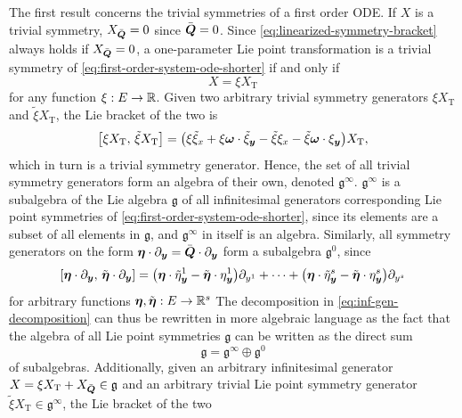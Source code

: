 The first result concerns the trivial symmetries of a first order ODE.
If \(X\) is a trivial symmetry, \(X_{\bar{\boldsymbol{Q}}} = 0\) since \(\bar{\boldsymbol{Q}} = 0\).
Since \cref{eq:linearized-symmetry-bracket} always holds if \(X_{\bar{\boldsymbol{Q}}} = 0\), a one-parameter Lie point transformation is a trivial symmetry of \cref{eq:first-order-system-ode-shorter} if and only if
\begin{equation*}
  X = \xi X_{\text{T}}
\end{equation*}
for any function \(\xi: E \to \mathbb{R}\).
Given two arbitrary trivial symmetry generators \(\xi X_{\text{T}}\) and \(\tilde{\xi} X_{\text{T}}\), the Lie bracket of the two is
\begin{equation*}
  \comm{\xi X_{\text{T}}}{\tilde{\xi} X_{\text{T}}} = \left(\xi \tilde{\xi}_x + \xi \vect{\omega} \cdot \tilde{\xi}_{\vect{y}} - \tilde{\xi} \xi_x - \tilde{\xi} \vect{\omega} \cdot \xi_{\vect{y}} \right) X_{\text{T}},
\end{equation*}
which in turn is a trivial symmetry generator.
Hence, the set of all trivial symmetry generators form an algebra of their own, denoted \(\mathfrak{g}^\infty\).
\(\mathfrak{g}^\infty\) is a subalgebra of the Lie algebra \(\mathfrak{g}\) of all infinitesimal generators corresponding Lie point symmetries of \cref{eq:first-order-system-ode-shorter}, since its elements are a subset of all elements in \(\mathfrak{g}\), and \(\mathfrak{g}^\infty\) in itself is an algebra.
Similarly, all symmetry generators on the form \(\boldsymbol{\eta} \cdot \partial_{\boldsymbol{y}} = \bar{\boldsymbol{Q}} \cdot \partial_{\boldsymbol{y}}\) form a subalgebra \(\mathfrak{g}^0\), since
\begin{equation*}
  \comm{\vect{\eta} \cdot \partial_{\vect{y}}}{\tilde{\vect{\eta}} \cdot \partial_{\vect{y}}} = \left(\vect{\eta} \cdot \tilde{\eta}^1_{\vect{y}} - \tilde{\vect{\eta}} \cdot \eta^1_{\vect{y}}\right) \partial_{y^1} + \dots + \left(\vect{\eta} \cdot \tilde{\eta}^s_{\vect{y}} - \tilde{\vect{\eta}} \cdot \eta^s_{\vect{y}}\right) \partial_{y^s}
\end{equation*}
for arbitrary functions \(\boldsymbol{\eta}, \tilde{\boldsymbol{\eta}}: E \to \mathbb{R}^s\)
The decomposition in \cref{eq:inf-gen-decomposition} can thus be rewritten in more algebraic language as the fact that the algebra of all Lie point symmetries \(\mathfrak{g}\) can be written as the direct sum
\begin{equation*}
  \mathfrak{g} = \mathfrak{g}^\infty \oplus \mathfrak{g}^0
\end{equation*}
of subalgebras.
Additionally, given an arbitrary infinitesimal generator \(X = \xi X_{\text{T}} + X_{\bar{\boldsymbol{Q}}} \in \mathfrak{g}\) and an arbitrary trivial Lie point symmetry generator \(\tilde{\xi} X_{\text{T}} \in \mathfrak{g}^\infty\), the Lie bracket of the two
